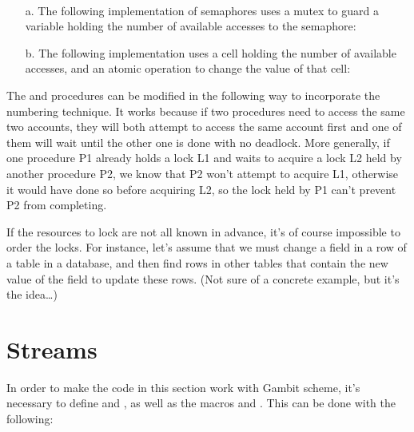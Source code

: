 \begin{exe}[3.47]
    \ \vspace{-20pt}
    \begin{itemize}
        \item[a.] The following implementation of semaphores uses a mutex to 
            guard a variable holding the number of available accesses to the 
            semaphore:
        \item[b.] The following implementation uses a cell holding the number of 
            available accesses, and an atomic  operation to 
            change the value of that cell:
    \end{itemize}
\end{exe}

\begin{exe}[3.48]
    The  and  
    procedures can be modified in the following way to incorporate the numbering 
    technique. It works because if two procedures need to access the same two 
    accounts, they will both attempt to access the same account first and one of 
    them will wait until the other one is done with no deadlock. More generally, 
    if one procedure P1 already holds a lock L1 and waits to acquire a lock L2 
    held by another procedure P2, we know that P2 won’t attempt to acquire L1, 
    otherwise it would have done so before acquiring L2, so the lock held by P1 
    can’t prevent P2 from completing.
\end{exe}

\begin{exe}[3.49]
    If the resources to lock are not all known in advance, it’s of course 
    impossible to order the locks. For instance, let’s assume that we must 
    change a field in a row of a table in a database, and then find rows in 
    other tables that contain the new value of the field to update these rows. 
    (Not sure of a concrete example, but it’s the idea…)
\end{exe}

\section{Streams}

\begin{comp}
    In order to make the code in this section work with Gambit scheme, it’s 
    necessary to define  and , as well 
    as the macros  and . This can be done with the 
    following:
\end{comp}

